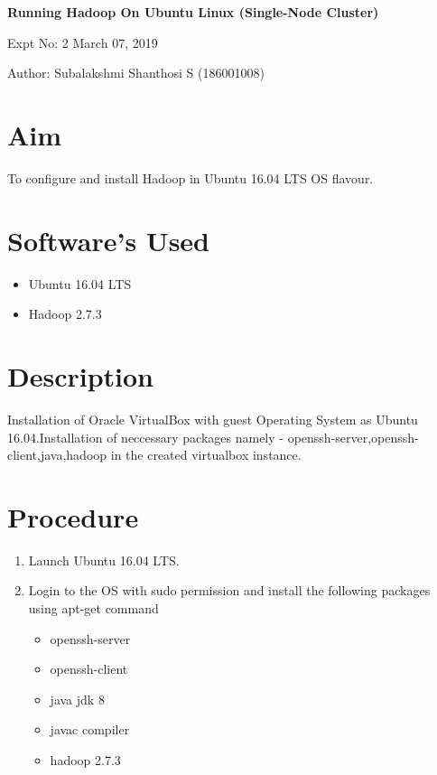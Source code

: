 \documentclass[a4paper,10pt]{article}
\begin{document}
\setcounter{secnumdepth}{-1} 

\begin{center}
\textbf{\LARGE Running Hadoop On Ubuntu Linux (Single-Node Cluster)}
\end{center}

\raggedright Expt No: 2 \hfill \raggedleft March  07, 2019 \\ 

\raggedright Author: Subalakshmi Shanthosi S  (186001008) \par 

\noindent\makebox[\linewidth]{\rule{\textwidth}{1pt}} 

\section{Aim}
To configure and install  Hadoop  in Ubuntu 16.04 LTS OS flavour.

\section{Software's Used}
\begin{itemize}
  \item Ubuntu  16.04 LTS
  \item Hadoop 2.7.3
\end{itemize}

\section{Description}
Installation of Oracle VirtualBox with guest Operating System as Ubuntu 16.04.Installation of neccessary packages namely - openssh-server,openssh-client,java,hadoop in the created virtualbox instance.
\section{Procedure}

\begin{enumerate}
	\item Launch Ubuntu 16.04 LTS.
	\item Login to the OS with sudo permission and install the following packages using apt-get command
	\begin{itemize}
		\item openssh-server
		\item openssh-client
		\item java jdk 8
		\item javac compiler
                     \item hadoop 2.7.3
	\end{itemize}
\pagebreak
\end{enumerate}
\end{document}
